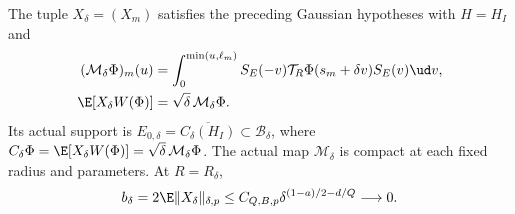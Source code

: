 \begin{proposition}
  \label{P:tube-actual-law}
  The tuple $X_\delta=(X_m)$ satisfies the preceding Gaussian
  hypotheses with $H=H_I$ and
  \begin{align}
    (\mathcal M_\delta\Phi)_m(u)
    &=\int_0^{\min(u,\ell_m)}
    S_E(-v)\mathcal T_R\Phi(s_m+\delta v)S_E(v)\ud v,
    \label{E:tube-actual-mean}\\
    \E[X_\delta W(\Phi)]&=\sqrt\delta\,\mathcal M_\delta\Phi .
    \label{E:tube-actual-covariance}
  \end{align}
  Its actual support is
  $E_{0,\delta}=\overline{C_\delta(H_I)}\subset\mathscr B_\delta$,
  where $C_\delta\Phi=\E[X_\delta W(\Phi)]
  =\sqrt\delta\,\mathcal M_\delta\Phi$.
  The actual map $\mathcal M_\delta$ is compact at each fixed radius
  and parameters. At $R=R_\delta$,
  \begin{equation}\label{E:tube-typical-radius}
    b_\delta=2\E\|X_\delta\|_{\delta,p}
    \le C_{Q,B,p}\delta^{(1-a)/2-d/Q}\longrightarrow0 .
  \end{equation}
\end{proposition}


